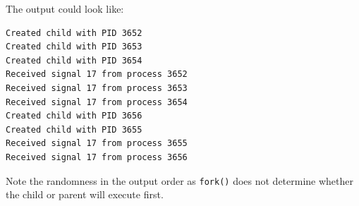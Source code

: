 \documentclass[a4paper]{article}
\begin{document}
The output could look like:
\begin{verbatim}
Created child with PID 3652
Created child with PID 3653
Created child with PID 3654
Received signal 17 from process 3652
Received signal 17 from process 3653
Received signal 17 from process 3654
Created child with PID 3656
Created child with PID 3655
Received signal 17 from process 3655
Received signal 17 from process 3656
\end{verbatim}
Note the randomness in the output order as \texttt{fork()} does not determine whether the child or parent will execute first.









\newpage
\appendix




\newpage
\printbibliography
\end{document}
